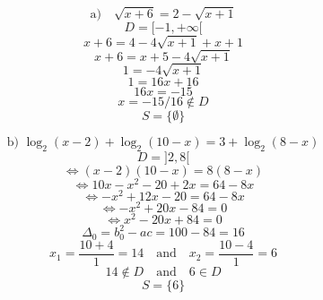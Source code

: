 \documentclass{article}
\begin{document}
\[ 
\text{a)} \quad \sqrt{x+6} = 2 - \sqrt{x+1} 
\]
\[ 
D = [-1, +\infty[ 
\]
\[ 
x+6 = 4 - 4\sqrt{x+1} + x+1 
\]
\[ 
x+6 = x+5 - 4\sqrt{x+1} 
\]
\[ 
1 = -4\sqrt{x+1} 
\]
\[ 
1 = 16x + 16 
\]
\[ 
16x = -15 
\]
\[ 
x = -15/16 \notin D 
\]
\[ 
S = \{\emptyset\} 
\]

\[
\text{b) } \log_2(x-2) + \log_2(10-x) = 3 + \log_2(8-x)
\]
\[
D = ]2, 8[
\]
\[
\Leftrightarrow (x-2)(10-x) = 8(8-x)
\]
\[
\Leftrightarrow 10x - x^2 - 20 + 2x = 64 - 8x
\]
\[
\Leftrightarrow -x^2 + 12x - 20 = 64 - 8x
\]
\[
\Leftrightarrow -x^2 + 20x - 84 = 0
\]
\[
\Leftrightarrow x^2 - 20x + 84 = 0
\]
\[
\Delta_0 = b_0^2 - ac = 100 - 84 = 16
\]
\[
x_1 = \frac{10+4}{1} = 14 \quad \text{and} \quad x_2 = \frac{10-4}{1} = 6
\]
\[
14 \notin D \quad \text{and} \quad 6 \in D 
\]
\[
S = \{6\}
\]
\end{document}
